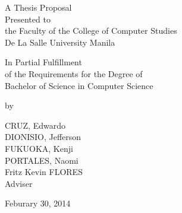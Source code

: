 %
%
%                 

\begin{titlepage}
\centering



\vspace{1.75cm}
A Thesis Proposal\\
Presented to\\
the Faculty of the College of Computer Studies\\
De La Salle University Manila

\vspace{1.75cm}
In Partial Fulfillment\\
of the Requirements for the Degree of\\
Bachelor of  Science in Computer Science

\vspace{1.75cm}
by\\
\vspace{1cm}

CRUZ, Edwardo \\
DIONISIO, Jefferson  \\
FUKUOKA, Kenji  \\
PORTALES, Naomi  \\

\vspace{1.75cm}
Fritz Kevin FLORES \\
Adviser

\vspace{1.75cm}
Feburary 30, 2014
\end{titlepage}
